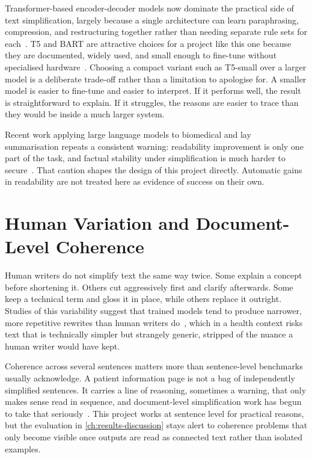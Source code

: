 Transformer-based encoder-decoder models now dominate the practical side of text simplification, largely because a single architecture can learn paraphrasing, compression, and restructuring together rather than needing separate rule sets for each~\cite{vaswani2017attention}. T5 and BART are attractive choices for a project like this one because they are documented, widely used, and small enough to fine-tune without specialised hardware~\cite{raffel2020t5,lewis2020bart}. Choosing a compact variant such as T5-small over a larger model is a deliberate trade-off rather than a limitation to apologise for. A smaller model is easier to fine-tune and easier to interpret. If it performs well, the result is straightforward to explain. If it struggles, the reasons are easier to trace than they would be inside a much larger system.

Recent work applying large language models to biomedical and lay summarisation repeats a consistent warning: readability improvement is only one part of the task, and factual stability under simplification is much harder to secure~\cite{llmbiomedsimplification2024}. That caution shapes the design of this project directly. Automatic gains in readability are not treated here as evidence of success on their own.

\section{Human Variation and Document-Level Coherence}
\label{sec:variation-coherence}

Human writers do not simplify text the same way twice. Some explain a concept before shortening it. Others cut aggressively first and clarify afterwards. Some keep a technical term and gloss it in place, while others replace it outright. Studies of this variability suggest that trained models tend to produce narrower, more repetitive rewrites than human writers do~\cite{variability2024tsar}, which in a health context risks text that is technically simpler but strangely generic, stripped of the nuance a human writer would have kept.

Coherence across several sentences matters more than sentence-level benchmarks usually acknowledge. A patient information page is not a bag of independently simplified sentences. It carries a line of reasoning, sometimes a warning, that only makes sense read in sequence, and document-level simplification work has begun to take that seriously~\cite{documentlevel2023tsar}. This project works at sentence level for practical reasons, but the evaluation in \cref{ch:results-discussion} stays alert to coherence problems that only become visible once outputs are read as connected text rather than isolated examples.

